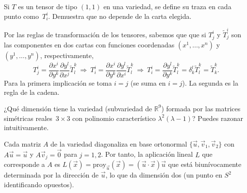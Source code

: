 \begin{problem}[3][3 puntos] Si $T$ es un tensor de tipo $(1,1)$ en una variedad, se define su traza en cada punto como~$T_i^i$. Demuestra que no depende de la carta elegida.
	
	\solution Por las reglas de transformación de los tensores, sabemos que que si $T^i_j$ y $\widetilde{T}^i_j$ son las componentes en dos cartas con funciones coordenadas $(x^1,\dots, x^n)$ y $(y^1,\dots, y^n)$, respectivamente, $${T}^i_j
	=
	\frac{\partial x^i}{\partial y^k}
	\frac{\partial y^l}{\partial x^j}
	\widetilde{T}^k_l
	\ \Rightarrow\ 
	{T}^i_i
	=
	\frac{\partial x^i}{\partial y^k}
	\frac{\partial y^l}{\partial x^i}
	\widetilde{T}^k_l
	\ \Rightarrow\ 
	{T}^i_i
	=
	\frac{\partial y^l}{\partial y^k}
	\widetilde{T}^k_l
	=
	\delta^l_k
	\widetilde{T}^k_l
	=
	\widetilde{T}^k_k.$$
	Para la primera implicación se toma $i=j$ (se suma en $i=j$). La segunda es la regla de la cadena. 
\end{problem}
\begin{problem}[4][1 punto] ¿Qué dimensión tiene la variedad (subvariedad de $ℝ^9$) formada por las matrices simétricas reales~$3\times 3$ con polinomio característico $\lambda^2(\lambda-1)$? Puedes razonar intuitivamente. 
	
	\solution Cada matriz $A$ de la variedad diagonaliza en base ortonormal $\{\vec{u},\vec{v}_1,\vec{v}_2\}$ con $A\vec{u}=\vec{u}$ y $A\vec{v}_j=\vec{0}$ para $j=1,2$. Por tanto, la aplicación lineal $L$ que corresponde a $A$ es $L(\vec{x})=\text{proy}_{\vec{u}}(\vec{x})=(\vec{u}\cdot \vec{x})\vec{u}$ que está biunívocamente determinada por la dirección de  $\vec{u}$, lo que da dimensión dos (un punto en $S^2$ identificando opuestos).   
\end{problem}
